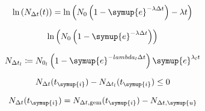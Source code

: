 \begin{equation}
   \text{ln} \left( N_{\Delta t}(t)\right) = \text{ln} \left( N_0 \left( 1- \symup{e}^{-\lambda \Delta t}\right) -\lambda t \right) \nonumber
\end{equation}

\begin{equation}
   \text{ln}\left(N_0\left(1- \symup{e}^{-\lambda\Delta t}\right)  \right) \nonumber
\end{equation}

\begin{equation}
   N_{\Delta t_{l}} \coloneqq N_{0_l}\left( 1- \symup{e}^{-lambda_{l} \Delta t}\right) \symup{e}^{\lambda_l t} \nonumber
\end{equation}

\begin{equation}
   N_{\Delta t}(t_{\symup{i}}) - N_{\Delta t_l}(t_{\symup{i}}) \leq 0 \nonumber
\end{equation}

\begin{equation}
   N_{\Delta t} (t_{\symup{i}}) = N_{\Delta t , \text{gem}}(t_{\symup{i}}) - N_{\Delta t, \symup{u}} \nonumber
\end{equation}